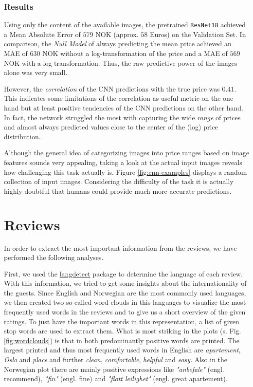 \documentclass[12pt, letterpaper]{article}
\begin{document}
\subsubsection{Results}

Using only the content of the available images, the pretrained \texttt{ResNet18} achieved a Mean Absolute Error of $579$ NOK (approx. $58$ Euros) on the Validation Set.
In comparison, the \emph{Null Model} of always predicting the mean price achieved an MAE of $630$ NOK without a log-transformation of the price and a MAE of $569$ NOK with a log-transformation.
Thus, the raw predictive power of the images alone was very small.

However, the \emph{correlation} of the CNN predictions with the true price was $0.41$.
This indicates some limitations of the correlation as useful metric on the one hand but at least positive tendencies of the CNN predictions on the other hand.
In fact, the network struggled the most with capturing the wide \emph{range} of prices and almost always predicted values close to the center of the (log) price distribution.

Although the general idea of categorizing images into price ranges based on image features sounds very appealing, taking a look at the actual input images reveals how challenging this task actually is.
Figure \ref{fig:cnn-examples} displays a random collection of input images.
Considering the difficulty of the task it is actually highly doubtful that humans could provide much more accurate predictions.

\section{Reviews}

In order to extract the most important information from the reviews, we have performed the following analyses.

First, we used the \href{https://pypi.org/project/langdetect/}{langdetect} package to determine the language of each review.
With this information, we tried to get some insights about the internationality of the guests.
Since English and Norwegian are the most commonly used languages, we then created two so-called word clouds in this languages
to visualize the most frequently used words in the reviews and to give us a short overview of the given ratings.
To just have the important words in this representation, a list of given stop words are used to extract them.
What is most striking in the plots (s. Fig. \ref{fig:wordclouds}) is that in both predominantly positive words are printed. The largest printed and thus most frequently used words in English are \textit{apartement}, \textit{Oslo} and \textit{place} and
further \textit{clean}, \textit{comfortable}, \textit{helpful} and \textit{easy}. Also in the Norwegian plot there are mainly positive expressions like \textit{"anbefale"} (engl. recommend), \textit{"fin"} (engl. fine) and \textit{"flott leilighet"} (engl. great apartement).
\end{document}
